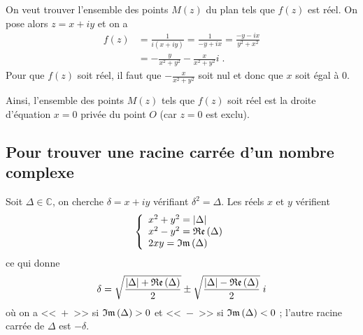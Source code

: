 \begin{fiche}
\begin{ex}
                              On veut trouver l'ensemble des points $M(z)$ du plan tels que $f(z)$ est r\'eel.
                              On pose alors $z = x + i y$ et on a 
                              \begin{align*}
                                    f(z) & = \frac{1}{i(x+iy)}                        
                                           = \frac{1}{-y+ix}                          
                                           = \frac{-y-ix}{y^2 + x^2}                  \\
                                         & = -\frac{y}{x^2+y^2}-\frac{x}{x^2+y^2}i    \;.
                              \end{align*}
                              Pour que $f(z)$ soit r\'eel, il faut que $-\frac{x}{x^2+y^2}$ soit nul
                              et donc que $x$ soit \'egal \`a $0$.
                              
                              Ainsi, l'ensemble des points $M(z)$ tels que $f(z)$ soit r\'eel est 
                              la droite d'\'equation $x=0$ priv\'ee du point $O$ (car $z=0$ est exclu).
                        \end{ex}
      \subsection*{Pour trouver une racine carr\'ee d'un nombre complexe}
            Soit $\Delta\in\mathbb{C}$, on cherche $\delta = x+iy$ v\'erifiant $\delta^2 = \Delta$.
            Les r\'eels $x$ et $y$ v\'erifient 
            \[
                  \left\lbrace
                        \begin{array}{l}
                              x^2 + y^2 = |\Delta|       \\
                              x^2 - y^2 = \mathfrak{Re}\left(\Delta\right)  \\
                              2 x y     = \mathfrak{Im}\left(\Delta\right)  
                        \end{array}
                  \right.
            \]
            ce qui donne
            \[
					\delta = \sqrt{\frac{|\Delta| + \mathfrak{Re}\left(\Delta\right)}{2}} \pm \sqrt{\frac{|\Delta| - \mathfrak{Re}\left(\Delta\right)}{2}} \; i
            \]
            o\`u on a <<~$+$~>> si $\mathfrak{Im}\left(\Delta\right) > 0$ et <<~$-$~>> si $\mathfrak{Im}\left(\Delta\right) < 0$ ;
            l'autre racine carr\'ee de $\Delta$ est $-\delta$.
            
      
      
      
      
      
      
      
      
      
      
      
      
      
\end{fiche}

